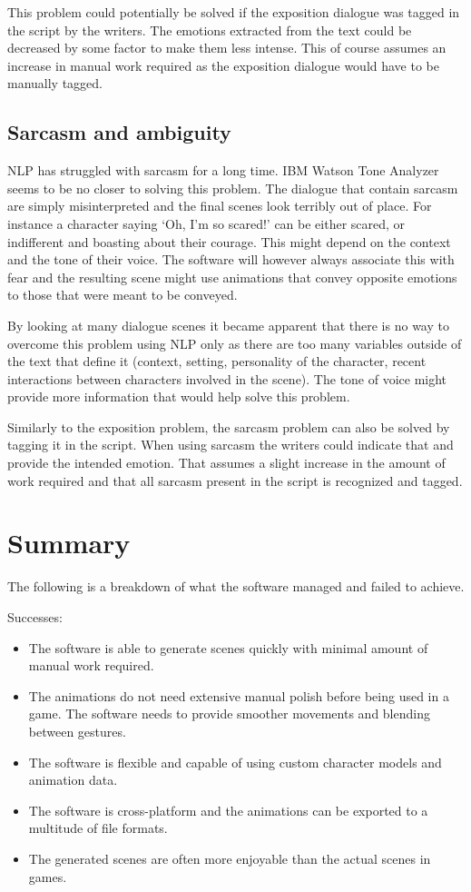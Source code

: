 This problem could potentially be solved if the exposition dialogue was tagged in the script by the writers. The emotions extracted from the text could be decreased by some factor to make them less intense. This of course assumes an increase in manual work required as the exposition dialogue would have to be manually tagged.


\subsection{Sarcasm and ambiguity}
NLP has struggled with sarcasm for a long time. IBM Watson Tone Analyzer seems to be no closer to solving this problem. The dialogue that contain sarcasm are simply misinterpreted and the final scenes look terribly out of place. For instance a character saying `Oh, I'm so scared!' can be either scared, or indifferent and boasting about their courage. This might depend on the context and the tone of their voice. The software will however always associate this with fear and the resulting scene might use animations that convey opposite emotions to those that were meant to be conveyed.

By looking at many dialogue scenes it became apparent that there is no way to overcome this problem using NLP only as there are too many variables outside of the text that define it (context, setting, personality of the character, recent interactions between characters involved in the scene). The tone of voice might provide more information that would help solve this problem.

Similarly to the exposition problem, the sarcasm problem can also be solved by tagging it in the script. When using sarcasm the writers could indicate that and provide the intended emotion. That assumes a slight increase in the amount of work required and that all sarcasm present in the script is recognized and tagged.


\section{Summary}
The following is a breakdown of what the software managed and failed to achieve.

\noindent Successes:
\begin{itemize}
	\item The software is able to generate scenes quickly with minimal amount of manual work required.
	\item The animations do not need extensive manual polish before being used in a game. The software needs to provide smoother movements and blending between gestures. 
	\item The software is flexible and capable of using custom character models and animation data.
	\item The software is cross-platform and the animations can be exported to a multitude of file formats.
	\item The generated scenes are often more enjoyable than the actual scenes in games.
\end{itemize}


